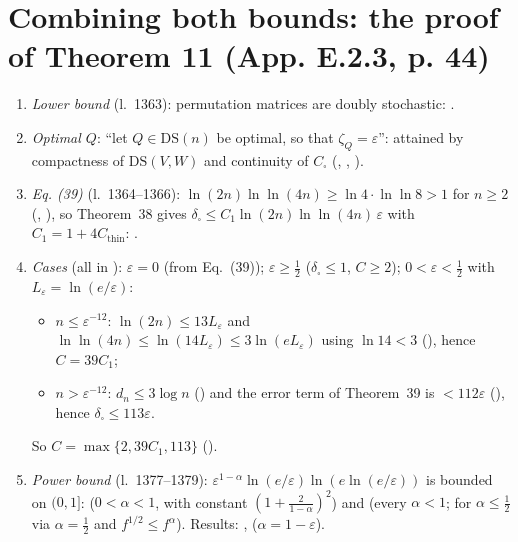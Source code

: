 \section{Combining both bounds: the proof of Theorem 11 (App. E.2.3, p. 44)}
\begin{enumerate}
\item \emph{Lower bound} (l.~1363): permutation matrices are doubly stochastic: .
\item \emph{Optimal $Q$}: ``let $Q\in\mathrm{DS}(n)$ be optimal, so that $\zeta_Q=\varepsilon$'': attained by compactness of
$\mathrm{DS}(V,W)$ and continuity of $C_\square$ (, ,
).
\item \emph{Eq. (39)} (l.~1364--1366): $\ln(2n)\ln\ln(4n)\ge\ln4\cdot\ln\ln8>1$ for $n\ge2$
(, ), so Theorem~38 gives
$\delta_\square\le C_1\ln(2n)\ln\ln(4n)\,\varepsilon$ with $C_1=1+4C_{\mathrm{thin}}$: .
\item \emph{Cases} (all in ): $\varepsilon=0$ (from Eq.~(39)); $\varepsilon\ge\frac12$ ($\delta_\square\le1$, $C\ge2$);
$0<\varepsilon<\frac12$ with $L_\varepsilon=\ln(e/\varepsilon)$:
  \begin{itemize}
  \item $n\le\varepsilon^{-12}$: $\ln(2n)\le13L_\varepsilon$ and $\ln\ln(4n)\le\ln(14L_\varepsilon)\le3\ln(eL_\varepsilon)$ using $\ln14<3$
  (), hence $C=39C_1$;
  \item $n>\varepsilon^{-12}$: $d_n\le3\log n$ () and the error term of Theorem~39 is $<112\varepsilon$
  (), hence $\delta_\square\le113\varepsilon$.
  \end{itemize}
  So $C=\max\{2,39C_1,113\}$ ().
\item \emph{Power bound} (l.~1377--1379): $\varepsilon^{1-\alpha}\ln(e/\varepsilon)\ln(e\ln(e/\varepsilon))$ is bounded on $(0,1]$:
 ($0<\alpha<1$, with constant $(1+\frac2{1-\alpha})^2$) and  (every $\alpha<1$;
for $\alpha\le\frac12$ via $\alpha=\frac12$ and $f^{1/2}\le f^\alpha$). Results: ,
 ($\alpha=1-\varepsilon$).
\end{enumerate}

